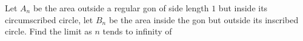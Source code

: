 Let $A_n$ be the area outside a regular gon of side length $1$ but inside its circumscribed circle, let $B_n$ be the area inside the gon but outside its inscribed circle.  Find the limit as $n$ tends to infinity of 